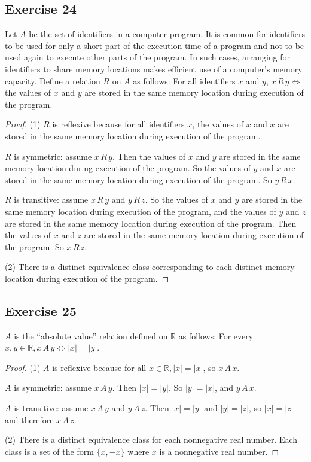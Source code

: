 \documentclass[14pt]{extarticle}
\newcommand{\R}{\mathbb{R}}
\begin{document}
\subsection{Exercise 24}
Let \(A\) be the set of identifiers in a computer program. It is common for identifiers to be used for only a short 
part of the execution time of a program and not to be used again to execute other parts of the program. In such cases, 
arranging for identifiers to share memory locations makes efficient use of a computer’s memory capacity. Define a 
relation \(R\) on \(A\) as follows: For all identifiers \(x\) and \(y\), \(x \,R\, y \iff\) the values of \(x\) and 
\(y\) are stored in the same memory location during execution of the program.

\begin{proof}
(1) \(R\) is reflexive because for all identifiers \(x\), the values of \(x\) and \(x\) are stored in the same memory 
location during execution of the program.

\(R\) is symmetric: assume \(x \,R\, y\). Then the values of \(x\) and \(y\) are stored in the same memory 
location during execution of the program. So the values of \(y\) and \(x\) are stored in the same memory location during execution of the program. So \(y \,R\, x\).

\(R\) is transitive: assume \(x \,R\, y\) and \(y \,R\, z\). So the values of \(x\) and \(y\) are stored in the 
same memory location during execution of the program, and the values of \(y\) and \(z\) are stored in the same memory 
location during execution of the program. Then the values of \(x\) and \(z\) are stored in the same memory location 
during execution of the program. So \(x \,R\, z\).

(2) There is a distinct equivalence class corresponding to each distinct memory location during execution of the 
program.
\end{proof}

\subsection{Exercise 25}
\(A\) is the “absolute value” relation defined on \(\R\) as follows: For every \(x, y \in \R, x \,A\, y \iff |x| = |y|\).

\begin{proof}
(1) \(A\) is reflexive because for all \(x \in \R, |x| = |x|\), so \(x \, A \, x\).

\(A\) is symmetric: assume \(x \,A\, y\). Then \(|x| = |y|\). So \(|y| = |x|\), and \(y \,A\, x\).

\(A\) is transitive: assume \(x \,A\, y\) and \(y \,A\, z\). Then \(|x| = |y|\) and \(|y| = |z|\), so \(|x| = |z|\)
and therefore \(x \,A\, z\).

(2) There is a distinct equivalence class for each nonnegative real number. Each class is a set of the form
\(\{x, -x\}\) where $x$ is a nonnegative real number.
\end{proof}
\end{document}
